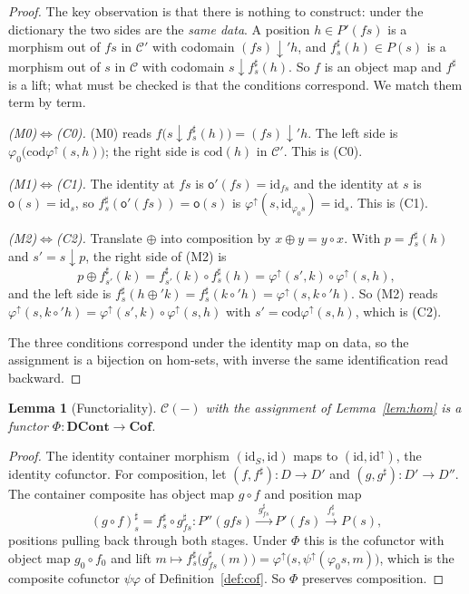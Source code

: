 \documentclass[11pt,a4paper]{amsart}
\newcommand{\Cof}{\mathbf{Cof}}
\newcommand{\DCont}{\mathbf{DCont}}
\newcommand{\id}{\mathrm{id}}
\newcommand{\cod}{\mathrm{cod}}
\theoremstyle{plain}
\newtheorem{lemma}[theorem]{Lemma}
\theoremstyle{definition}
\theoremstyle{remark}
\begin{document}
\begin{proof}
The key observation is that there is nothing to construct: under the dictionary the two
sides are the \emph{same data}. A position $h\in P'(fs)$ is a morphism out of $fs$ in
$\mathcal C'$ with codomain $(fs)\downarrow' h$, and $f^\sharp_s(h)\in P(s)$ is a
morphism out of $s$ in $\mathcal C$ with codomain $s\downarrow f^\sharp_s(h)$. So $f$ is
an object map and $f^\sharp$ is a lift; what must be checked is that the conditions
correspond. We match them term by term.

\emph{(M0)$\Leftrightarrow$(C0).} (M0) reads
$f\big(s\downarrow f^\sharp_s(h)\big)=(fs)\downarrow' h$. The left side is
$\varphi_0\big(\cod\varphi^\uparrow(s,h)\big)$; the right side is $\cod(h)$ in
$\mathcal C'$. This is (C0).

\emph{(M1)$\Leftrightarrow$(C1).} The identity at $fs$ is $\mathsf o'(fs)=\id_{fs}$ and
the identity at $s$ is $\mathsf o(s)=\id_s$, so $f^\sharp_s(\mathsf o'(fs))=\mathsf o(s)$
is $\varphi^\uparrow(s,\id_{\varphi_0 s})=\id_s$. This is (C1).

\emph{(M2)$\Leftrightarrow$(C2).} Translate $\oplus$ into composition by
$x\oplus y=y\circ x$. With $p=f^\sharp_s(h)$ and $s'=s\downarrow p$, the right side of
(M2) is
\[
  p\oplus f^\sharp_{s'}(k)=f^\sharp_{s'}(k)\circ f^\sharp_s(h)
  =\varphi^\uparrow(s',k)\circ\varphi^\uparrow(s,h),
\]
and the left side is
$f^\sharp_s(h\oplus' k)=f^\sharp_s(k\circ' h)=\varphi^\uparrow(s,k\circ' h)$. So (M2)
reads $\varphi^\uparrow(s,k\circ' h)=\varphi^\uparrow(s',k)\circ\varphi^\uparrow(s,h)$
with $s'=\cod\varphi^\uparrow(s,h)$, which is (C2).

The three conditions correspond under the identity map on data, so the assignment is a
bijection on hom-sets, with inverse the same identification read backward.
\end{proof}

\begin{lemma}[Functoriality]\label{lem:fun}
$\mathcal C(-)$ with the assignment of Lemma~\ref{lem:hom} is a functor
$\Phi\colon\DCont\to\Cof$.
\end{lemma}

\begin{proof}
The identity container morphism $(\id_S,\id)$ maps to $(\id,\id^\uparrow)$, the identity
cofunctor. For composition, let $(f,f^\sharp)\colon D\to D'$ and
$(g,g^\sharp)\colon D'\to D''$. The container composite has object map $g\circ f$ and
position map
\[
  (g\circ f)^\sharp_s = f^\sharp_s\circ g^\sharp_{fs}\colon
  P''(gfs)\xrightarrow{\ g^\sharp_{fs}\ }P'(fs)\xrightarrow{\ f^\sharp_s\ }P(s),
\]
positions pulling back through both stages. Under $\Phi$ this is the cofunctor with
object map $g_0\circ f_0$ and lift
$m\mapsto f^\sharp_s\big(g^\sharp_{fs}(m)\big)
=\varphi^\uparrow\big(s,\psi^\uparrow(\varphi_0 s,m)\big)$, which is the composite
cofunctor $\psi\varphi$ of Definition~\ref{def:cof}. So $\Phi$ preserves composition.
\end{proof}
\end{document}
